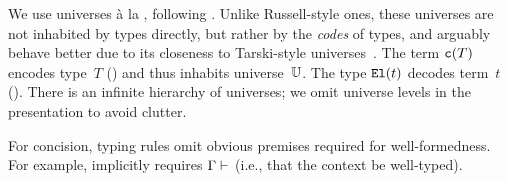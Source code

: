 
We use universes à la \citet{coquand2013presheaf}, following \citet{kaposi2019gluing}.
Unlike Russell-style ones, these universes are not inhabited by types directly,
but rather by the \emph{codes} of types,
and arguably behave better due to its closeness to Tarski-style universes~\cite{luo2012notes}. 
The term $\texttt{c}({T})$ encodes type~$T$ () and thus inhabits universe~$\mathbb{U}$.
The type $\texttt{El}({t})$ decodes term~$t$ ().
There is an infinite hierarchy of universes;
we omit universe levels in the presentation to avoid clutter.

For concision, typing rules omit obvious premises required for well-formedness.
For example,  implicitly requires $ {\Gamma} \vdash_{} $
(i.e., that the context be well-typed).

